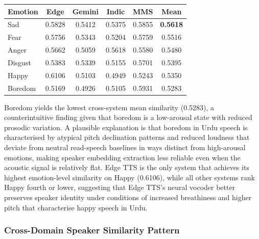 \documentclass[a4paper,fleqn]{cas-dc}
\begin{document}
    
    \begin{table}[t]
    \label{tbl:sim_emotion}
    
    \small
    \renewcommand{\arraystretch}{1.15}
    
    \begin{tabular*}{\textwidth}{@{\extracolsep{\fill}}lccccc@{}}
    
    \toprule
    \textbf{Emotion} & \textbf{Edge} & \textbf{Gemini} &
    \textbf{Indic} & \textbf{MMS} & \textbf{Mean} \\
    \midrule
    Sad       & 0.5828 & 0.5412 & 0.5375 & 0.5855 & \textbf{0.5618} \\
    Fear      & 0.5756 & 0.5343 & 0.5204 & 0.5759 & 0.5516 \\
    Anger     & 0.5662 & 0.5059 & 0.5618 & 0.5580 & 0.5480 \\
    Disgust   & 0.5383 & 0.5339 & 0.5155 & 0.5701 & 0.5395 \\
    Happy     & 0.6106 & 0.5103 & 0.4949 & 0.5243 & 0.5350 \\
    Boredom   & 0.5169 & 0.4926 & 0.5105 & 0.5931 & 0.5283 \\
    \bottomrule
    \end{tabular*}
    \end{table}
    
    Boredom yields the lowest cross-system mean similarity (0.5283), a
    counterintuitive finding given that boredom is a low-arousal state
    with reduced prosodic variation. A plausible explanation is that
    boredom in Urdu speech is characterised by atypical pitch declination
    patterns and reduced loudness that deviate from neutral read-speech
    baselines in ways distinct from high-arousal emotions, making speaker
    embedding extraction less reliable even when the acoustic signal is
    relatively flat. Edge TTS is the only system that achieves its highest
    emotion-level similarity on Happy (0.6106), while all other systems
    rank Happy fourth or lower, suggesting that Edge TTS's neural vocoder
    better preserves speaker identity under conditions of increased
    breathiness and higher pitch that characterise happy speech in Urdu.
    
    \subsubsection{Cross-Domain Speaker Similarity Pattern}
    
\end{document}
